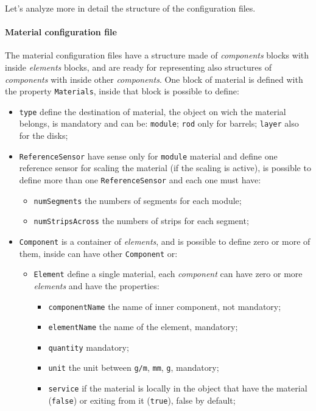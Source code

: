 \documentclass[12pt, a4paper]{article}
\newcommand{\prop}[1]{\texttt{#1}}
\begin{document}
Let's analyze more in detail the structure of the configuration files.

\paragraph{Material configuration file}
The material configuration files have a structure made of
\emph{components} blocks with inside \emph{elements} blocks, and are ready for
representing also structures of \emph{components} with inside other
\emph{components}. One block of material is defined with the property
\prop{Materials}, inside that block is possible to define:
\begin{itemize} 
\item \prop{type} define the destination of material, the object on wich the material
  belongs, is mandatory and
  can be: \prop{module}; \prop{rod} only for barrels; \prop{layer} also for the disks;
\item \prop{ReferenceSensor} have sense only for \prop{module}
  material and define
  one reference sensor for scaling the material (if the scaling is
  active), is possible to define more than one \prop{ReferenceSensor} and each one must have:
  \begin{itemize} 
  \item \prop{numSegments} the numbers of segments for each module;
  \item \prop{numStripsAcross} the numbers of strips for each segment;
  \end{itemize}
\item \prop{Component} is a container of \emph{elements}, and is
  possible to define zero or more of them, inside can have other \prop{Component} or:
  \begin{itemize} 
  \item \prop{Element} define a single material, each \emph{component}
    can have zero or more \emph{elements} and have the properties:
    \begin{itemize} 
    \item \prop{componentName} the name of inner component, not mandatory;
    \item \prop{elementName} the name of the element, mandatory;
    \item \prop{quantity} mandatory;
    \item \prop{unit} the unit between \prop{g/m}, \prop{mm}, \prop{g}, mandatory;
    \item \prop{service} if the material is locally in the object that
      have the material (\prop{false}) or exiting from it (\prop{true}), false by default;

\end{itemize}
\end{itemize}
\end{itemize}
\end{document}
